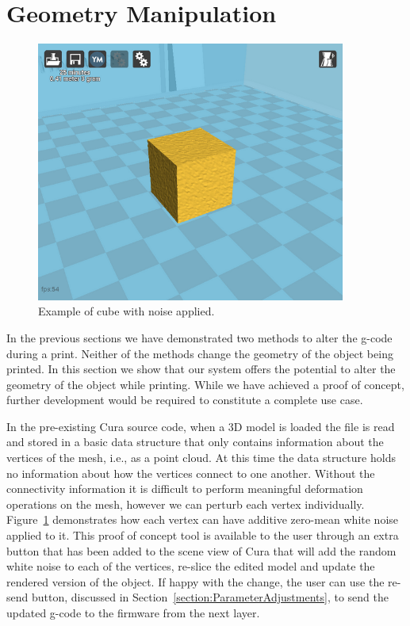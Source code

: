 \documentclass[pdftex, 11pt]{report} %
\begin{document}
\section{Geometry Manipulation}
\label{section:GeometryManipulation}
\begin{figure}[H]
  \centering
  \includegraphics[width=4in]{CubeNoise.png}
  \caption{Example of cube with noise applied.}
  \label{figure:CubeNoise}
\end{figure}

In the previous sections we have demonstrated two methods to alter the g-code during a print. Neither of the methods change the geometry of the object being printed. In this section we show that our system offers the potential to alter the geometry of the object while printing. While we have achieved a proof of concept, further development would be required to constitute a complete use case. 

In the pre-existing Cura source code, when a 3D model is loaded the file is read and stored in a basic data structure that only contains information about the vertices of the mesh, i.e., as a point cloud. At this time the data structure holds no information about how the vertices connect to one another. Without the connectivity information it is difficult to perform meaningful deformation operations on the mesh, however we can perturb each vertex individually. Figure~\ref{figure:CubeNoise} demonstrates how each vertex can have additive zero-mean white noise applied to it. This proof of concept tool is available to the user through an extra button that has been added to the scene view of Cura that will add the random white noise to each of the vertices, re-slice the edited model and update the rendered version of the object. If happy with the change, the user can use the re-send button, discussed in Section~\ref{section:ParameterAdjustments}, to send the updated g-code to the firmware from the next layer.
\end{document}
